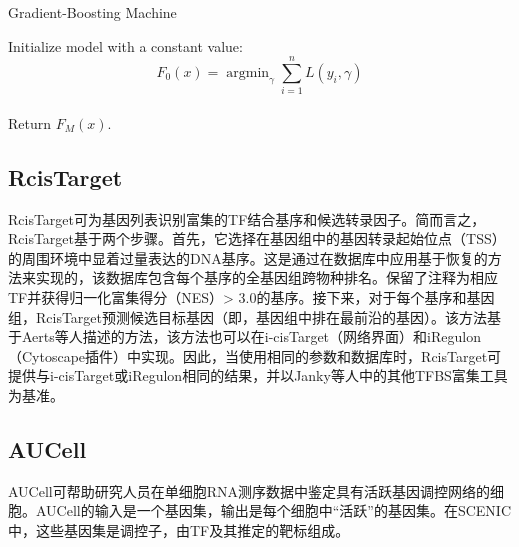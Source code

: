 \begin{algorithm}[H]
  \caption{Gradient-Boosting Machine}
  \SetAlgoLined
  Initialize model with a constant value: $$F_{0}(x) = \mathop{\arg\min}_{\gamma}\sum^{n}_{i=1}L(y_{i},\gamma)$$\\
  Return $F_{M}(x)$.\\
  \label{alg:gbm}
\end{algorithm}

\subsection{RcisTarget}
  RcisTarget可为基因列表识别富集的TF结合基序和候选转录因子。简而言之，RcisTarget基于两个步骤。首先，它选择在基因组中的基因转录起始位点（TSS）的周围环境中显着过量表达的DNA基序。这是通过在数据库中应用基于恢复的方法来实现的，该数据库包含每个基序的全基因组跨物种排名。保留了注释为相应TF并获得归一化富集得分（NES）> 3.0的基序。接下来，对于每个基序和基因组，RcisTarget预测候选目标基因（即，基因组中排在最前沿的基因）。该方法基于Aerts等人\cite{aerts2010robust}描述的方法，该方法也可以在i-cisTarget（网络界面）\cite{herrmann2012cistarget}和iRegulon（Cytoscape插件）\cite{verfaillie2014iregulon}中实现。因此，当使用相同的参数和数据库时，RcisTarget可提供与i-cisTarget或iRegulon相同的结果，并以Janky等人\cite{verfaillie2014iregulon}中的其他TFBS富集工具为基准。
\subsection{AUCell}
  AUCell可帮助研究人员在单细胞RNA测序数据中鉴定具有活跃基因调控网络的细胞。AUCell的输入是一个基因集，输出是每个细胞中“活跃”的基因集。在SCENIC中，这些基因集是调控子，由TF及其推定的靶标组成。

